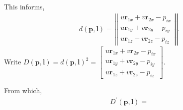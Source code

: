 \begin{solution}
	This informs,
	\begin{align}
		d(\bm{p}, \bm{l}) = \left|\left|\begin{array}{c}
		u\bm{r}_{1x} + v\bm{r}_{2x} -	p_{ix} \\ u\bm{r}_{1y}+ v\bm{r}_{2y} - p_{iy}   \\ u \bm{r}_{1z} + v\bm{r}_{2z} - p_{iz} 
		\end{array}  
		\right|\right|.
	\end{align}
	Write $D(\bm{p}, \bm{l}) = d(\bm{p}, \bm{l})^2 =  \left[\begin{array}{c}
	u\bm{r}_{1x} + v\bm{r}_{2x} -	p_{ix} \\ u\bm{r}_{1y}+ v\bm{r}_{2y} - p_{iy}   \\ u \bm{r}_{1z} + v\bm{r}_{2z} - p_{iz} 
	\end{array}  
	\right]$.
	
	From which,
	\begin{align}
		D^\prime (\bm{p}, \bm{l}) = 
	\end{align}
\end{solution}
